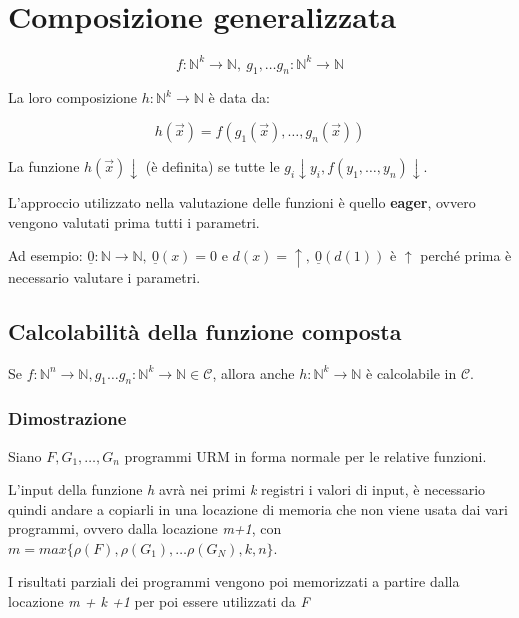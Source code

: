 \section{Composizione generalizzata}\label{composizione-generalizzata}

$$f: \mathbb{N}^k \rightarrow \mathbb{N},\: g_1,\ldots g_n : \mathbb{N}^k \rightarrow \mathbb{N}$$

La loro composizione $h: \mathbb{N}^k \rightarrow \mathbb{N}$ è data da: 

$$
h(\vec{x}) = f(g_1(\vec{x}), \ldots, g_n(\vec{x}))
$$

La funzione $h(\vec{x})\downarrow$ (è definita) se tutte le
$g_i \downarrow y_i, f(y_1,\ldots,y_n) \downarrow$.

L'approccio utilizzato nella valutazione delle funzioni è quello
\textbf{eager}, ovvero vengono valutati prima tutti i parametri.

Ad esempio: $\underline{0} : \mathbb{N} \rightarrow \mathbb{N},\: \underline{0}(x) = 0$ e $d(x) = \uparrow,\: \underline{0}(d(1))$ è
$\uparrow$ perché prima è necessario valutare i parametri.

\subsection{Calcolabilità della funzione
composta}\label{calcolabilituxe0-della-funzione-composta}

Se $f: \mathbb{N}^n \rightarrow \mathbb{N}, g_1\ldots g_n : \mathbb{N}^k \rightarrow \mathbb{N} \in \mathcal{C}$, allora anche $h: \mathbb{N}^k \rightarrow \mathbb{N}$ è calcolabile in $\mathcal{C}$.

\subsubsection{Dimostrazione}\label{dimostrazione}

Siano $F,G_1, \ldots{}, G_n$ programmi URM in forma normale per
le relative funzioni.

L'input della funzione \emph{h} avrà nei primi \emph{k} registri i
valori di input, è necessario quindi andare a copiarli in una locazione
di memoria che non viene usata dai vari programmi, ovvero dalla
locazione \emph{m+1}, con $m = max\{\rho(F), \rho(G_1), \ldots \rho(G_N), k,n\}$.

I risultati parziali dei programmi vengono poi memorizzati a partire
dalla locazione \emph{m + k +1} per poi essere utilizzati da \emph{F}

